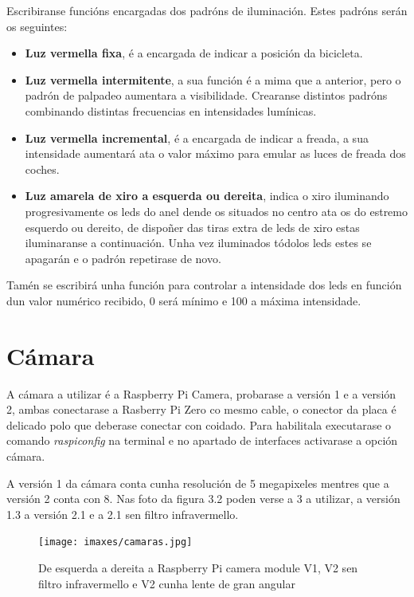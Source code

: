 Escribiranse funcións encargadas dos padróns de iluminación. Estes padróns serán os seguintes:
\begin{itemize}
    \item \textbf{Luz vermella fixa},
    é a encargada de indicar a posición da bicicleta.
    \item \textbf{Luz vermella intermitente},
    a sua función é a mima que a anterior, pero o padrón de palpadeo aumentara a visibilidade. Crearanse distintos padróns combinando distintas frecuencias en intensidades lumínicas.
    \item \textbf{Luz vermella incremental},
    é a encargada de indicar a freada, a sua intensidade aumentará ata o valor máximo para emular as luces de freada dos coches.
    \item \textbf{Luz amarela de xiro a esquerda ou dereita},
    indica o xiro iluminando progresivamente os leds do anel dende os situados no centro ata os do estremo esquerdo ou dereito, de dispoñer das tiras extra de leds de xiro estas iluminaranse a continuación. Unha vez iluminados tódolos leds estes se apagarán e o padrón repetirase de novo.
\end{itemize}

Tamén se escribirá unha función para controlar a intensidade dos leds en función dun valor numérico recibido, 0 será mínimo e 100 a máxima intensidade.

\section{Cámara}

A cámara a utilizar é a Raspberry Pi Camera, probarase a versión 1 e a versión 2, ambas conectarase a Rasberry Pi Zero co mesmo cable, o conector da placa é delicado polo que deberase conectar con coidado. Para habilitala executarase o comando \emph{raspiconfig} na terminal e no apartado de interfaces activarase a opción cámara.

A versión 1 da cámara conta cunha resolución de 5 megapixeles mentres que a versión 2 conta con 8. Nas foto da figura 3.2 poden verse a 3 a utilizar, a versión 1.3 a versión 2.1 e a 2.1 sen filtro infravermello.
\begin{figure}[tb]
  \centering
  \texttt{[image: imaxes/camaras.jpg]}
  \caption{De esquerda a dereita a Raspberry Pi camera module V1, V2 sen filtro infravermello e V2 cunha lente de gran angular}
  \label{f:Cámaras}
\end{figure}
